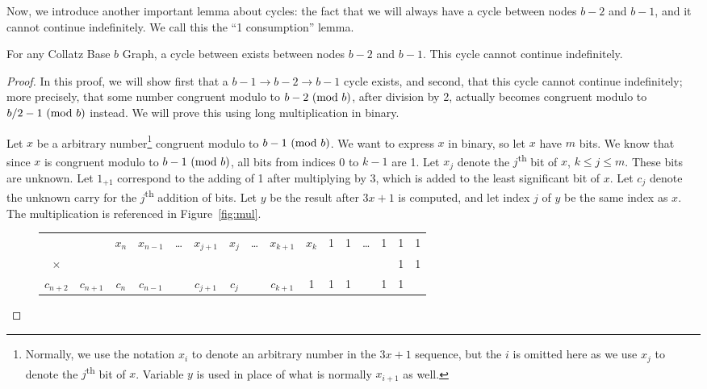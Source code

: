 Now, we introduce another important lemma about cycles: the fact that we will always have a cycle between nodes $b-2$ and $b-1$, and it cannot continue indefinitely. We call this the ``1 consumption'' lemma.
\begin{lemma}
\label{lem:oneConsumption}
 For any Collatz Base $b$ Graph, a cycle between exists between nodes $b-2$ and $b-1$. This cycle cannot continue indefinitely.
\end{lemma}
\begin{proof}
In this proof, we will show first that a $b-1 \rightarrow b-2 \rightarrow b-1$ cycle exists, and second, that this cycle cannot continue indefinitely; more precisely, that some number congruent modulo to $b-2 \ (\mathrm{mod}\ b)$, after division by 2, actually becomes congruent modulo to $b/2-1 \ (\mathrm{mod}\ b)$ instead. We will prove this using long multiplication in binary. \par
Let $x$ be a arbitrary number\footnote{Normally, we use the notation $x_i$ to denote an arbitrary number in the $3x+1$ sequence, but the $i$ is omitted here as we use $x_j$ to denote the $j$\textsuperscript{th} bit of $x$. Variable $y$ is used in place of what is normally $x_{i+1}$ as well. } congruent modulo to $b-1 \ (\mathrm{mod}\ b)$. We want to express $x$ in binary, so let $x$ have $m$ bits. We know that since $x$ is congruent modulo to $b-1 \ (\mathrm{mod}\ b)$, all bits from indices 0 to $k-1$ are 1. Let $x_j$ denote the $j$\textsuperscript{th} bit of $x$, $k \leq j \leq m$. These bits are unknown. Let $1_{+1}$ correspond to the adding of 1 after multiplying by 3, which is added to the least significant bit of $x$. Let $c_j$ denote the unknown carry for the $j$\textsuperscript{th} addition of bits. Let $y$ be the result after $3x+1$ is computed, and let index $j$ of $y$ be the same index as $x$. The multiplication is referenced in Figure~\ref{fig:mul}. \par
\begin{figure}
\begin{tabular}{*{16}c}%
 & & $ x_{n}$  & $ x_{n-1}$  & \ldots & $ x_{j+1}$  & $ x_{j}$  & \ldots & $ x_{k+1}$  & $ x_{k}$  & 1 & 1 & \ldots & 1 & 1 & 1 \\
$\times$ & & & & & & & & & & & & & & 1 & 1 \\
\hline
\tiny ${\scriptscriptstyle c_{n+2}}$ & ${\scriptscriptstyle c_{n+1}}$ & ${\scriptscriptstyle c_{n}}$ & ${\scriptscriptstyle c_{n-1}}$ & & ${\scriptscriptstyle c_{j+1}}$ & ${\scriptscriptstyle c_{j}}$ & & ${\scriptscriptstyle c_{k+1}}$ & \tiny 1 & \tiny 1 &  \tiny 1 & &  \tiny 1 & \tiny 1 & \\

\end{tabular}
\end{figure}
\end{proof}
